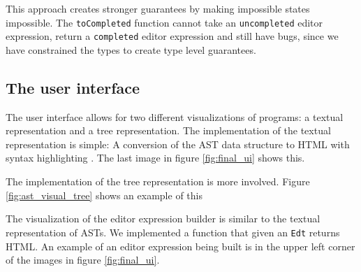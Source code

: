 This approach creates stronger guarantees by making impossible states
impossible. The \texttt{toCompleted} function cannot take an
\texttt{uncompleted} editor expression, return a \texttt{completed} editor
expression and still have bugs, since we have constrained the types to create
type level guarantees.

\subsection{The user interface}
\label{user-interface}

The user interface allows for two different visualizations of
programs: a textual representation and a tree representation. The
implementation of the textual representation is simple: A conversion
of the AST data structure to HTML with syntax highlighting . The last
image in figure \ref{fig:final_ui} shows this.

The implementation of the tree representation is more involved. Figure
\ref{fig:ast_visual_tree} shows an example of this

The visualization of the editor expression builder is similar to the textual
representation of ASTs. We implemented a function that given an \texttt{Edt}
returns HTML. An example of an
editor expression being built is in the upper left corner of the images in
figure \ref{fig:final_ui}.

